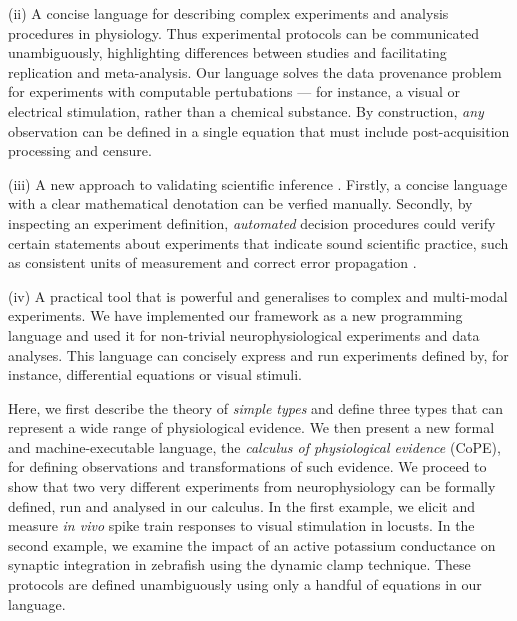 (ii) A concise language for describing complex experiments and
analysis procedures in physiology. Thus experimental protocols can be
communicated unambiguously, highlighting differences between studies
and facilitating replication and meta-analysis. Our language solves
the data provenance problem \citep{Pool2002,MacKenzie-Graham2008,
  VanHorn2009} for experiments with computable pertubations --- for
instance, a visual or electrical stimulation, rather than a chemical
substance. By construction, \emph{any} observation can be defined in a
single equation that must include post-acquisition processing
and censure.

(iii) A new approach to validating scientific inference
\citep{Editors2003, Editors2010}. Firstly, a concise language with a
clear mathematical denotation can be verfied manually. Secondly, by
inspecting an experiment definition, \emph{automated} decision procedures
could verify certain statements about experiments that indicate sound
scientific practice, such as consistent units of measurement
\citep{Kennedy1997} and correct error propagation \citep{Taylor1997}.

(iv) A practical tool that is powerful and generalises to complex and
multi-modal experiments. We have implemented our framework as a new
programming language and used it for non-trivial neurophysiological
experiments and data analyses. This language can concisely express and
run experiments defined by, for instance, differential equations or
visual stimuli.

Here, we first describe the theory of \emph{simple types}
\citep{Pierce2002} and define three types that can represent a wide
range of physiological evidence. We then present a new formal and
machine-executable language, the \emph{calculus of physiological
  evidence} (CoPE), for defining observations and transformations of such
evidence. We proceed to show that two very different experiments from
neurophysiology can be formally defined, run and analysed in our
calculus. In the first example, we elicit and measure \emph{in vivo}
spike train responses to visual stimulation in locusts. In the second
example, we examine the impact of an active potassium conductance on
synaptic integration in zebrafish using the dynamic clamp
technique. These protocols are defined unambiguously using only a
handful of equations in our language. 

